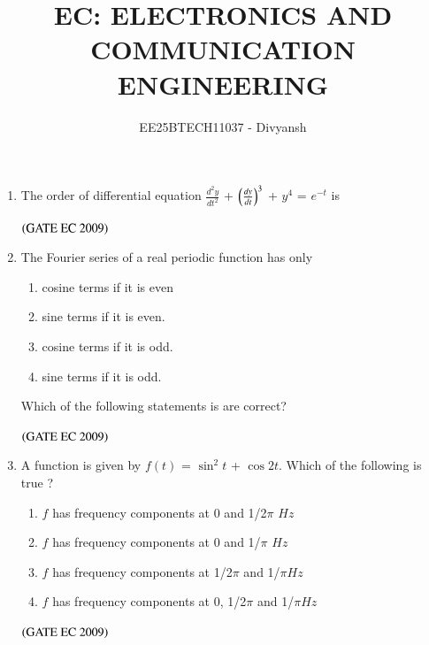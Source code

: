 \documentclass[journal,12pt,onecolumn]{IEEEtran}
\title{EC: ELECTRONICS AND COMMUNICATION ENGINEERING}
\author{EE25BTECH11037 - Divyansh}
\theoremstyle{remark}
\begin{document}
\maketitle

\begin{enumerate}[start=1, label={Q\arabic*.}]

\item The order of differential equation  $\frac{d^2y}{dt^2}$ + $\left(\frac{dy}{dt}\right)^3$ + $y^4$ = $e^{-t}$ is
\begin{enumerate}
\end{enumerate}
\hfill $\left(\text{GATE EC 2009}\right)$
\item The Fourier series of a real periodic function has only 
\begin{enumerate}[start=16, label=\Alph*]
\item cosine terms if it is even

\item sine terms if it is even. 

\item cosine terms if it is odd.

\item sine terms if it is odd.
\end{enumerate}
Which of the following statements is are correct?

\begin{enumerate}
\end{enumerate}
\hfill $\left(\text{GATE EC 2009}\right)$

\item A function is given by $f(t)$ = $\sin^2t$ + $\cos2t$. Which of the following is true ?

\begin{enumerate}
    \item $f$ has frequency components at 0 and 1/2$\pi$ $Hz $
    \item $f$ has frequency components at 0 and 1/$\pi$ $Hz $
    \item $f$ has frequency components at 1/2$\pi$ and 1/$\pi$$ Hz$ 
    \item $f$ has frequency components at 0, 1/2$\pi$ and 1/$\pi$$ Hz$ 
\end{enumerate}
\hfill $\left(\text{GATE EC 2009}\right)$


\end{enumerate}
\end{document}

